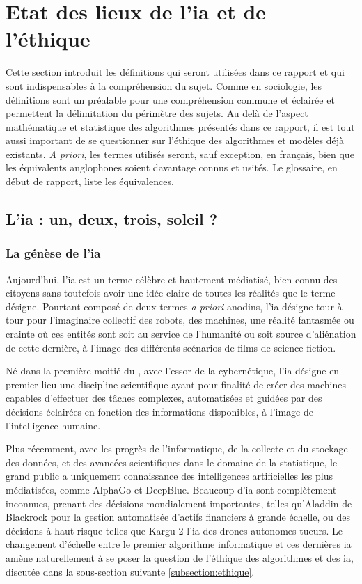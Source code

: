 \section{Etat des lieux de l'\gls{ia} et de l'éthique}

Cette section introduit les définitions qui seront utilisées dans ce rapport et qui sont indispensables à la compréhension du sujet. Comme en sociologie, les définitions sont un préalable pour une compréhension commune et éclairée et permettent la délimitation du périmètre des sujets. Au delà de l'aspect mathématique et statistique des algorithmes présentés dans ce rapport, il est tout aussi important de se questionner sur l'éthique des algorithmes et modèles déjà existants. \textit{A priori}, les termes utilisés seront, sauf exception, en français, bien que les équivalents anglophones soient davantage connus et usités. Le glossaire, en début de rapport, liste les équivalences.

\subsection{L'\gls{ia} : un, deux, trois, soleil ?}

\subsubsection{La génèse de l'\gls{ia}}
Aujourd'hui, l'\gls{ia} est un terme célèbre et hautement médiatisé, bien connu des citoyens sans toutefois avoir une idée claire de toutes les réalités que le terme désigne. Pourtant composé de deux termes \textit{a priori} anodins, l'\gls{ia} désigne tour à tour pour l'imaginaire collectif des robots, des machines, une réalité fantasmée ou crainte où ces entités sont soit au service de l'humanité ou soit source d'aliénation de cette dernière, à l'image des différents scénarios de films de science-fiction.


Né dans la première moitié du , avec l'essor de la cybernétique, l'\gls{ia} désigne en premier lieu une discipline scientifique ayant pour finalité de créer des machines capables d'effectuer des tâches complexes, automatisées et guidées par des décisions éclairées en fonction des informations disponibles, à l'image de l'intelligence humaine.

Plus récemment, avec les progrès de l'informatique, de la collecte et du stockage des données, et des avancées scientifiques dans le domaine de la statistique, le grand public a uniquement connaissance des intelligences artificielles les plus médiatisées, comme AlphaGo et DeepBlue. Beaucoup d'\gls{ia} sont complètement inconnues, prenant des décisions mondialement importantes, telles qu'Aladdin de Blackrock pour la gestion automatisée d'actifs financiers à grande échelle, ou des décisions à haut risque telles que Kargu-2 l'\gls{ia} des drones autonomes tueurs. Le changement d'échelle entre le premier algorithme informatique et ces dernières \gls{ia} amène naturellement à se poser la question de l'éthique des algorithmes et des \gls{ia}, discutée dans la sous-section suivante \ref{subsection:ethique}.

